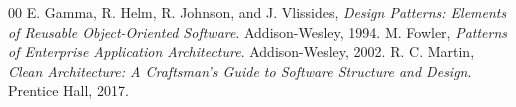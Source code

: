 \documentclass[conference]{IEEEtran}
\begin{document}
\begin{thebibliography}{00}
 E. Gamma, R. Helm, R. Johnson, and J. Vlissides, \textit{Design Patterns: Elements of Reusable Object-Oriented Software}. Addison-Wesley, 1994.
 M. Fowler, \textit{Patterns of Enterprise Application Architecture}. Addison-Wesley, 2002.
 R. C. Martin, \textit{Clean Architecture: A Craftsman's Guide to Software Structure and Design}. Prentice Hall, 2017.
\end{thebibliography}
\end{document}
